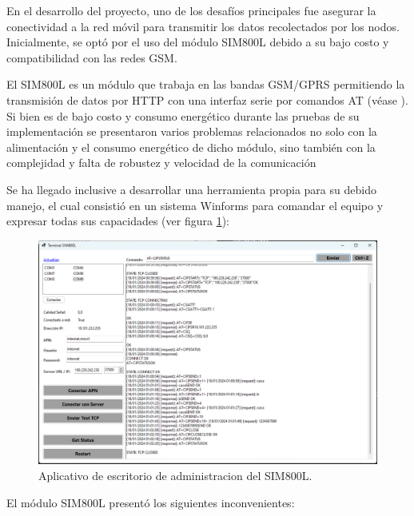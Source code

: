 \label{sec:capaTransporte}

En el desarrollo del proyecto, uno de los desafíos principales fue asegurar la conectividad a la red móvil para transmitir los datos recolectados por los nodos. Inicialmente, se optó por el uso del módulo SIM800L debido a su bajo costo y compatibilidad con las redes GSM.

El SIM800L es un módulo que trabaja en las bandas GSM/GPRS permitiendo la transmisión de datos por HTTP con una interfaz serie por comandos AT (véase \cite{SIM800Datasheet}).
Si bien es de bajo costo y consumo energético durante las pruebas de su implementación se presentaron varios problemas relacionados no solo con la alimentación y el consumo energético de dicho módulo, sino también con la complejidad y falta de robustez y velocidad de la comunicación

Se ha llegado inclusive a desarrollar una herramienta propia para su debido manejo, el cual consistió en un sistema Winforms para comandar el equipo y expresar todas sus capacidades (ver figura \ref{fig:aplicativoSIM800L}):

\begin{figure}[H]
    \centering
    \includegraphics[width=1\linewidth]{Figures/Firmware/admin_gsm.png}
    \caption{Aplicativo de escritorio de administracion del SIM800L.}
    \label{fig:aplicativoSIM800L}
\end{figure}

El módulo SIM800L presentó los siguientes inconvenientes:

